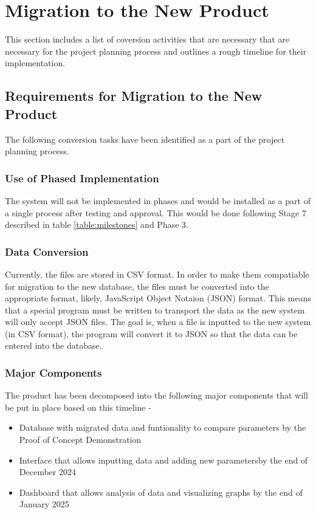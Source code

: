 \documentclass[12pt]{article}
\begin{document}
\section{Migration to the New Product}
This section includes a list of coversion activities that are necessary that are necessary for the project planning process and outlines a rough timeline for their implementation.
\subsection{Requirements for Migration to the New Product}
The following conversion tasks have been identified as a part of the project planning process.
\subsubsection{Use of Phased Implementation}
The system will not be implemented in phases and would be installed as a part of a single process after testing and approval. This would be done following Stage 7 described in table
\ref{table:milestones} and Phase 3.

\subsubsection{Data Conversion}
\label{data}
Currently, the files are stored in CSV format. In order to make them compatiable for migration to the new database, the files must be converted into the appropriate format, likely, 
JavaScript Object Notaion (JSON) format. This means that a special program must be written to transport the data as the new system will only accept JSON files. 
The goal is, when a file is inputted to the new system (in CSV format), the program will convert it to JSON so that the data can be entered into the database.

\subsubsection{Major Components}
The product has been decomposed into the following major components that will be put in place based on this timeline - 
\begin{itemize}
  \item Database with migrated data and funtionality to compare parameters by the Proof of Concept Demonstration
  \item Interface that allows inputting data and adding new parametersby the end of December 2024
  \item Dashboard that allows analysis of data and visualizing graphs by the end of January 2025
\end{itemize}
\end{document}
